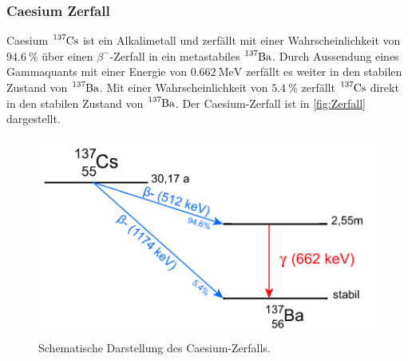 \subsubsection{Caesium Zerfall}
\label{subsubsec:Caesium}
Caesium $\ce{^{137}Cs}$ ist ein Alkalimetall und zerfällt mit einer Wahrscheinlichkeit von $\qty{94.6}{\percent}$ über einen $\beta^-$-Zerfall
in ein metastabiles $\ce{^{137}Ba}$.
Durch Aussendung eines Gammaquants mit einer Energie von $\qty{0.662}{\mega\eV}$ zerfällt es weiter in den stabilen Zustand von $\ce{^{137}Ba}$.
Mit einer Wahrscheinlichkeit von $\qty{5.4}{\percent}$ zerfällt $\ce{^{137}Cs}$ direkt in den stabilen Zustand von $\ce{^{137}Ba}$.
Der Caesium-Zerfall ist in \autoref{fig:Zerfall} dargestellt.
\begin{figure}[H]
    \centering
    \includegraphics[scale=0.7]{Abbildungen/Caesiumzerfall.png}
    \caption{Schematische Darstellung des Caesium-Zerfalls.\cite{Gammaspektrum}}
    \label{fig:Gammaspektrum}
\end{figure}



